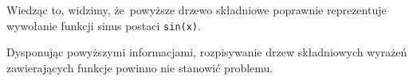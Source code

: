 \documentclass[10pt,t]{beamer}
\begin{document}
\begin{frame}










  Wiedząc to, widzimy, że~powyższe drzewo składniowe poprawnie
  reprezentuje wywołanie funkcji sinus postaci \texttt{sin(x)}.

  Dysponując powyższymi informacjami, rozpisywanie drzew składniowych
  wyrażeń zawierających funkcje powinno nie stanowić problemu.

\end{frame}
\end{document}
